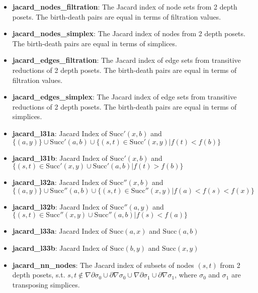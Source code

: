 \documentclass{article}
\begin{document}
\begin{itemize}

\item \textbf{jacard\_nodes\_filtration}: The Jacard index of node sets from 2 depth posets.
The birth-death pairs are equal in terms of filtration values.

\item \textbf{jacard\_nodes\_simplex}: The Jacard index of nodes from 2 depth posets.
The birth-death pairs are equal in terms of simplices.

\item \textbf{jacard\_edges\_filtration}: The Jacard index of edge sets from transitive reductions of 2 depth posets.
The birth-death pairs are equal in terms of filtration values.

\item \textbf{jacard\_edges\_simplex}: The Jacard index of edge sets from transitive reductions of 2 depth posets.
The birth-death pairs are equal in terms of simplices.

\item \textbf{jacard\_l31a}: Jacard Index of $\text{Succ}'(x, b)$ and $\{(a, y)\} \cup \text{Succ}'(a, b) \cup \{(s, t)\in \text{Succ}'(x, y) | f(t) < f(b)\}$

\item \textbf{jacard\_l31b}: %
Jacard Index of $\text{Succ}'(x, b)$ and $\{(s, t)\in \text{Succ}'(x, y) \cup \text{Succ}'(a, b) | f(t) > f(b)\}$

\item \textbf{jacard\_l32a}: Jacard Index of $\text{Succ}''(x, b)$ and $\{(a, y)\} \cup \text{Succ}''(a, b) \cup \{(s, t)\in \text{Succ}''(x, y) | f(a) < f(s) < f(x)\}$

\item \textbf{jacard\_l32b}: %
Jacard Index of $\text{Succ}''(a, y)$ and $\{(s, t)\in \text{Succ}''(x, y) \cup \text{Succ}''(a, b) | f(s) < f(a)\}$

\item \textbf{jacard\_l33a}: Jacard Index of $\text{Succ}(a, x)$ and $\text{Succ}(a, b)$

\item \textbf{jacard\_l33b}: Jacard Index of $\text{Succ}(b, y)$ and $\text{Succ}(x, y)$

\item \textbf{jacard\_nn\_nodes}: The Jacard index of subsets of nodes $(s, t)$ from 2 depth posets, s.t.
$s, t \notin \nabla\partial\sigma_0 \cup \partial\nabla\sigma_0 \cup \nabla\partial\sigma_1 \cup \partial\nabla\sigma_1$,
where $\sigma_0$ and $\sigma_1$ are transposing simplices.


\end{itemize}
\end{document}
